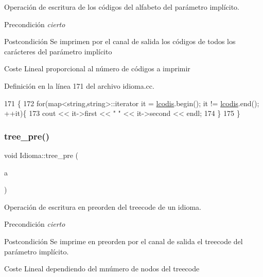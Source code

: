 Operación de escritura de los códigos del alfabeto del parámetro implícito. 

\begin{DoxyPrecond}{Precondición}
{\itshape cierto} 
\end{DoxyPrecond}
\begin{DoxyPostcond}{Postcondición}
Se imprimen por el canal de salida los códigos de todos los carácteres del parámetro implícito 
\end{DoxyPostcond}
\begin{DoxyParagraph}{Coste}
Lineal proporcional al número de códigos a imprimir 
\end{DoxyParagraph}


Definición en la línea 171 del archivo idioma.\+cc.


\begin{DoxyCode}
171                     \{
172   \textcolor{keywordflow}{for}(map<string,string>::iterator it = \hyperlink{class_idioma_ab908f7375f4506b26dd3cd163bc0b8cd}{lcodis}.begin(); it != \hyperlink{class_idioma_ab908f7375f4506b26dd3cd163bc0b8cd}{lcodis}.end(); ++it)\{
173     cout << it->first << \textcolor{stringliteral}{" "} << it->second << endl;
174   \}
175 \}
\end{DoxyCode}
\mbox{\label{class_idioma_aaf85e226b876366ea2cb1ebf5cf04388}} 
\subsubsection{\texorpdfstring{tree\+\_\+pre()}{tree\_pre()}}
{\footnotesize\ttfamily void Idioma\+::tree\+\_\+pre (\begin{DoxyParamCaption}\item[{const Bin\+Tree$<$ pair$<$ string, int $>$$>$ \&}]{a }\end{DoxyParamCaption})}



Operación de escritura en preorden del treecode de un idioma. 

\begin{DoxyPrecond}{Precondición}
{\itshape cierto} 
\end{DoxyPrecond}
\begin{DoxyPostcond}{Postcondición}
Se imprime en preorden por el canal de salida el treecode del parámetro implícito. 
\end{DoxyPostcond}
\begin{DoxyParagraph}{Coste}
Lineal dependiendo del mnúmero de nodos del treecode 
\end{DoxyParagraph}


